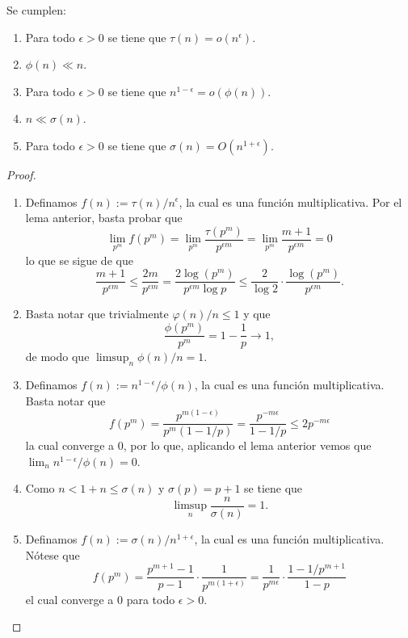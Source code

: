 \documentclass[teoria-numeros.tex]{subfiles}
\begin{document}
\begin{prop}
	Se cumplen:
	\begin{enumerate}
		\item Para todo $\epsilon > 0$ se tiene que $\tau(n) = o(n^\epsilon)$.
		\item $\phi(n) \ll n$.
		\item Para todo $\epsilon > 0$ se tiene que $n^{1 - \epsilon} = o(\phi(n))$.
		\item $n \ll \sigma(n)$.
		\item Para todo $\epsilon > 0$ se tiene que $\sigma(n) = O(n^{1 + \epsilon})$.
	\end{enumerate}
\end{prop}
\begin{proof}
	\begin{enumerate}
		\item Definamos $f(n) := \tau(n)/n^\epsilon$, la cual es una función multiplicativa.
			Por el lema anterior, basta probar que
			\[
				\lim_{p^m} f(p^m) = \lim_{p^m} \frac{\tau(p^m)}{p^{\epsilon m}} = \lim_{p^m} \frac{m+1}{p^{\epsilon m}} = 0
			\]
			lo que se sigue de que
			\[
				\frac{m+1}{p^{\epsilon m}} \le \frac{2m}{p^{\epsilon m}} = \frac{2 \log(p^m)}{p^{\epsilon m} \log p}
				\le \frac{2}{\log 2} \cdot \frac{\log(p^m)}{p^{\epsilon m}}.
			\]
		\item Basta notar que trivialmente $\varphi(n) / n \le 1$ y que
			$$ \frac{\phi(p^m)}{p^m} = 1 - \frac{1}{p} \to 1, $$
			de modo que $\limsup_n \phi(n)/n = 1$.
		\item Definamos $f(n) := n^{1 - \epsilon}/\phi(n)$, la cual es una función multiplicativa.
			Basta notar que
			$$ f(p^m) = \frac{p^{m(1 - \epsilon)}}{p^m(1 - 1/p)} = \frac{p^{-m \epsilon}}{1 - 1/p} \le 2p^{-m \epsilon} $$
			la cual converge a 0, por lo que, aplicando el lema anterior vemos que $\lim_n n^{1 - \epsilon}/\phi(n) = 0$.
		\item Como $n < 1 + n \le \sigma(n)$ y $\sigma(p) = p + 1$ se tiene que
			$$ \limsup_n \frac{n}{\sigma(n)} = 1. $$
		\item Definamos $f(n) := \sigma(n) / n^{1 + \epsilon}$, la cual es una función multiplicativa.
			Nótese que
			\[
				f(p^m) = \frac{p^{m+1} - 1}{p - 1} \cdot \frac{1}{p^{m(1 + \epsilon)}} = \frac{1}{p^{m\epsilon}} \cdot \frac{1 - 1/p^{m+1}}{1 - p}
			\]
			el cual converge a 0 para todo $\epsilon > 0$. \qedhere
	\end{enumerate}
\end{proof}
\end{document}
